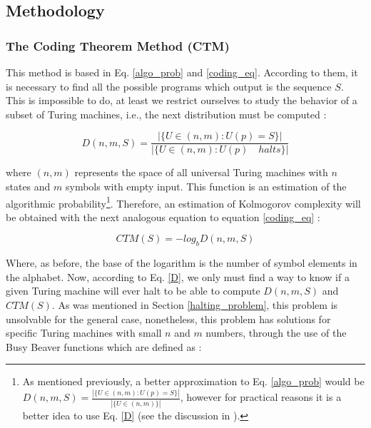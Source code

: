 \subsection{Methodology}

\subsubsection{The Coding Theorem Method (CTM)}
This method is based in Eq. \ref{algo_prob} and \ref{coding_eq}. According to them, it is necessary to find all the possible programs which output is the sequence $S$. This is impossible to do, at least we restrict ourselves to study the behavior of a subset of Turing machines, i.e., the next distribution must be computed \cite{kolmo_calculating}:

\begin{equation}
\label{D}
D(n,m,S)=\frac{| \{U\in (n,m) : U(p)=S \} |}{| \{U\in (n,m) : U(p) \quad halts \} |}
\end{equation}

where $(n,m)$ represents the space of all universal Turing machines with $n$ states and $m$ symbols with empty input. This function is an estimation of the algorithmic probability\footnote{As mentioned previously, a better approximation to Eq. \ref{algo_prob} would be $D(n,m,S)=\frac{| \{U\in (n,m) : U(p)=S \} |}{| \{U\in (n,m) \} |}$, however for practical reasons it is a better idea to use Eq. \ref{D} (see the discussion in \cite{kolmo_calculating}).}. Therefore, an estimation of Kolmogorov complexity will be obtained with the next analogous equation to equation \ref{coding_eq} \cite{decomposition}:

\begin{equation}
\label{ctm}
CTM(S)=-log_{b}D(n,m,S)
\end{equation}

Where, as before, the base of the logarithm is the number of symbol elements in the alphabet. Now, according to Eq. \ref{D}, we only must find a way to know if a given Turing machine will ever halt to be able to compute $D(n,m,S)$ and $CTM(S)$. As was mentioned in Section \ref{halting_problem}, this problem is unsolvable for the general case, nonetheless, this problem has solutions for specific Turing machines with small $n$ and $m$ numbers, through the use of the Busy Beaver functions which are defined as \cite{kolmo_calculating}:

